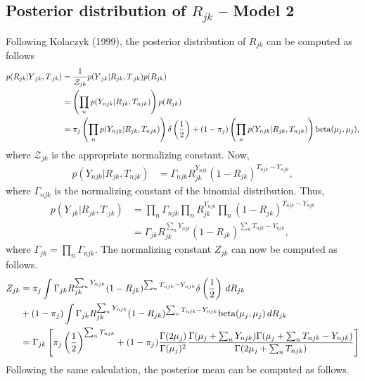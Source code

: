 \documentclass[reqno]{amsart}
\numberwithin{equation}{section}
\begin{document}
\subsection{Posterior distribution of $R_{jk}$ -- Model 2}
Following Kolaczyk (1999), the posterior distribution of $R_{jk}$ can be computed as follows
\begin{align}
    p(R_{jk} | Y_{\cdot jk}, T_{\cdot jk})
        &= \frac{1}{\mathcal{Z}_{jk}} p(Y_{\cdot jk} | R_{jk}, T_{\cdot jk}) p(R_{jk}) \\
        &= \left( \prod_n p(Y_{njk} | R_{jk}, T_{njk}) \right) p(R_{jk}) \\
        &= \pi_j \left( \prod_n p(Y_{njk} | R_{jk}, T_{njk}) \right) \delta \left(\frac{1}{2} \right) + (1-\pi_j) \left( \prod_n p(Y_{njk} | R_{jk}, T_{njk}) \right) \mathrm{beta}(\mu_j, \mu_j),
\end{align}
where $\mathcal{Z}_{jk}$ is the appropriate normalizing constant.
Now,
\begin{align}
    p(Y_{njk} | R_{jk}, T_{njk})
        &= \Gamma_{njk} R_{jk}^{Y_{njk}} (1-R_{jk})^{T_{njk}-Y_{njk}},
\end{align}
where $\Gamma_{njk}$ is the normalizing constant of the binomial distribution. Thus,
\begin{align}
    p(Y_{\cdot jk} | R_{jk}, T_{\cdot jk})
        &= \prod_n \Gamma_{njk} \prod_n R_{jk}^{Y_{njk}} \prod_n (1-R_{jk})^{T_{njk}-Y_{njk}} \\
        &= \Gamma_{jk} R_{jk}^{\sum_n Y_{njk}} (1-R_{jk})^{\sum_n T_{njk}-Y_{njk}},
\end{align}
where $\Gamma_{jk} = \prod_n \Gamma_{njk}$. The normalizing constant $Z_{jk}$ can now be computed as follows.
\begin{align}
    Z_{jk} 
        &= \pi_j \int \Gamma_{jk} R_{jk}^{\sum_n Y_{njk}} (1-R_{jk})^{\sum_n T_{njk}-Y_{njk}} \delta \left(\frac{1}{2} \right) \,dR_{jk} \\
        &+ (1-\pi_j) \int \Gamma_{jk} R_{jk}^{\sum_n Y_{njk}} (1-R_{jk})^{\sum_n T_{njk}-Y_{njk}} \mathrm{beta}(\mu_j, \mu_j) \,dR_{jk} \\
        &= \Gamma_{jk} \left[ \pi_j \left( \frac{1}{2} \right)^{\sum_n T_{njk}} + (1-\pi_j) \frac{\Gamma(2\mu_j)}{\Gamma(\mu_j)^2} 
        \frac{\Gamma(\mu_j+\sum_n Y_{njk}) \Gamma(\mu_j+\sum_n T_{njk} - Y_{njk})}{\Gamma(2\mu_j+\sum_n T_{njk})} \right]
\end{align}
Following the same calculation, the posterior mean can be computed as follows.
\end{document}
